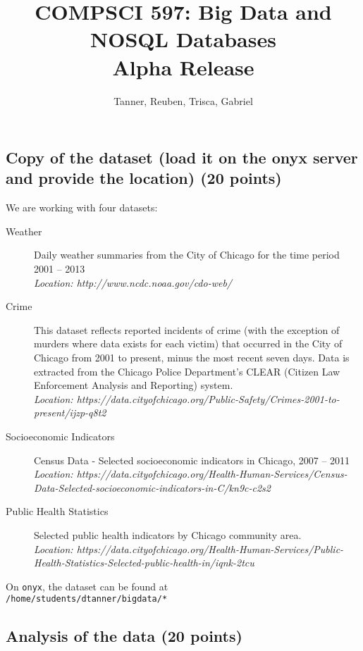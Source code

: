 \documentclass[a4paper,10pt]{article}
\title{{\large{COMPSCI 597: Big Data and NOSQL Databases}}\\Alpha Release}
\author{Tanner, Reuben, Trisca, Gabriel}
\begin{document}
\maketitle
\subsection*{Copy of the dataset (load it on the onyx server and provide the location) (20 points)}

We are working with four datasets:
\begin{description}
	\item[Weather] Daily weather summaries from the City of Chicago for the time period 2001 – 2013 \\\textit{Location: http://www.ncdc.noaa.gov/cdo-web/}
	
	\item[Crime] This dataset reflects reported incidents of crime (with the exception of murders where data exists for each victim) that occurred in the City of Chicago from 2001 to present, minus the most recent seven days. Data is extracted from the Chicago Police Department's CLEAR (Citizen Law Enforcement Analysis and Reporting) system. \\\textit{Location: https://data.cityofchicago.org/Public-Safety/Crimes-2001-to-present/ijzp-q8t2}
	
	\item[Socioeconomic Indicators] Census Data - Selected socioeconomic indicators in Chicago, 2007 – 2011 \\\textit{Location: https://data.cityofchicago.org/Health-Human-Services/Census-Data-Selected-socioeconomic-indicators-in-C/kn9c-c2s2}
	
	\item[Public Health Statistics] Selected public health indicators by Chicago community area.\\\textit{Location: https://data.cityofchicago.org/Health-Human-Services/Public-Health-Statistics-Selected-public-health-in/iqnk-2tcu}
	
\end{description}


On \texttt{onyx}, the dataset can be found at \\\texttt{/home/students/dtanner/bigdata/*}


\subsection*{Analysis of the data (20 points)}
\end{document}
